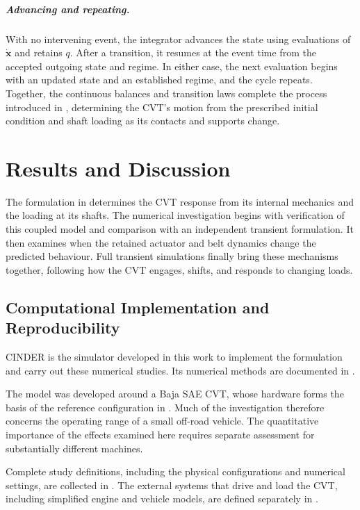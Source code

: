 \documentclass[11pt]{report}
\numberwithin{equation}{section}
\newcommand{\vect}[1]{\bm{#1}}
\begin{document}
\paragraph{Advancing and repeating.}
With no intervening event, the integrator advances the state using
evaluations of \(\dot{\vect{x}}\) and retains \(q\). After a transition,
it resumes at the event time from the accepted outgoing state and regime.
In either case, the next evaluation begins with an updated state and an
established regime, and the cycle repeats. Together, the continuous balances
and transition laws complete the process introduced in
,
determining the CVT's motion from the prescribed initial condition and shaft
loading as its contacts and supports change.

\chapter{Results and Discussion}
\label{chap:results}

The formulation in  determines the CVT response from
its internal mechanics and the loading at its shafts. The numerical
investigation begins with verification of this coupled model and comparison
with an independent transient formulation. It then examines when the retained
actuator and belt dynamics change the predicted behaviour. Full transient
simulations finally bring these mechanisms together, following how the CVT
engages, shifts, and responds to changing loads.

\section{Computational Implementation and Reproducibility}
\label{sec:results_implementation_reproducibility}

CINDER is the simulator developed in this work to implement the formulation
and carry out these numerical studies. Its numerical methods are documented in
.

The model was developed around a Baja SAE CVT, whose hardware forms the basis
of the reference configuration in
. Much of the investigation therefore
concerns the operating range of a small off-road vehicle. The quantitative
importance of the effects examined here requires separate assessment for
substantially different machines.

Complete study definitions, including the physical configurations and numerical
settings, are collected in . The external
systems that drive and load the CVT, including simplified engine and vehicle
models, are defined separately in .
\end{document}
